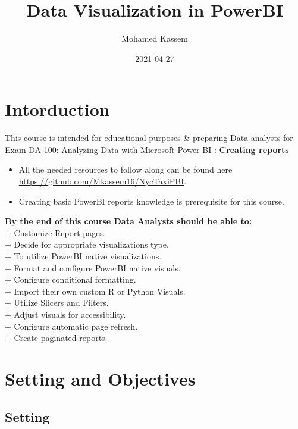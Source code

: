 \documentclass[
]{book}
\title{Data Visualization in PowerBI}
\author{Mohamed Kassem}
\date{2021-04-27}
\begin{document}
\maketitle

{
\setcounter{tocdepth}{1}
\tableofcontents
}
\hypertarget{intorduction}{%
\chapter{Intorduction}\label{intorduction}}

This course is intended for educational purposes \& preparing Data analysts for Exam DA-100: Analyzing Data with Microsoft Power BI : \textbf{Creating reports}

\begin{itemize}
\item
  All the needed resources to follow along can be found here \url{https://github.com/Mkassem16/NycTaxiPBI}.
\item
  Creating basic PowerBI reports knowledge is prerequisite for this course.
\end{itemize}

\textbf{By the end of this course Data Analysts should be able to:}\\
+ Customize Report pages.\\
+ Decide for appropriate visualizations type.\\
+ To utilize PowerBI native visualizations.\\
+ Format and configure PowerBI native visuals.\\
+ Configure conditional formatting.\\
+ Import their own custom R or Python Visuals.\\
+ Utilize Slicers and Filters.\\
+ Adjust visuals for accessibility.\\
+ Configure automatic page refresh.\\
+ Create paginated reports.

\hypertarget{setting-and-objectives}{%
\chapter{Setting and Objectives}\label{setting-and-objectives}}

\hypertarget{setting}{%
\section{Setting}\label{setting}}
\end{document}
